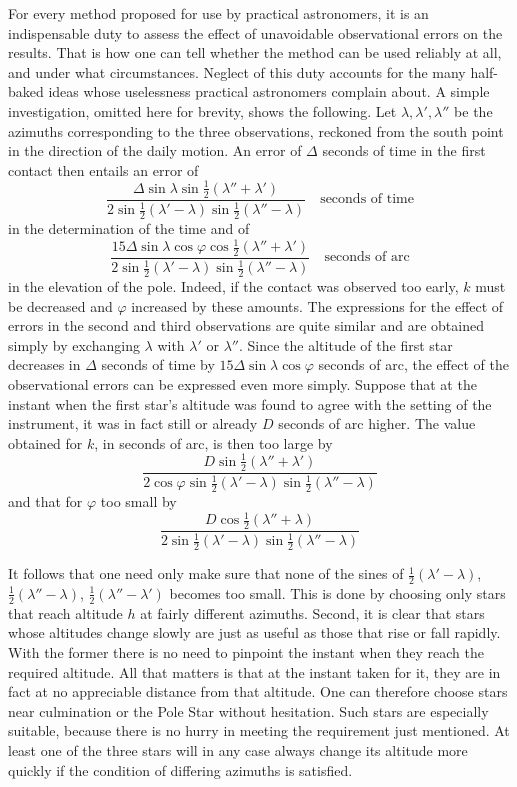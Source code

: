 For every method proposed for use by practical astronomers, it is an indispensable duty to assess the effect of unavoidable observational errors on the results. That is how one can tell whether the method can be used reliably at all, and under what circumstances. Neglect of this duty accounts for the many half-baked ideas whose uselessness practical astronomers complain about. A simple investigation, omitted here for brevity,
%
shows the following. Let $\lambda,\lambda',\lambda''$ be the azimuths corresponding to the three observations, reckoned from the south point in the direction of the daily motion. An error of $\Delta$ seconds of time in the first contact then entails an error of
\[
\frac{\Delta\sin\lambda\sin\tfrac12(\lambda''+\lambda')}{2\sin\tfrac12(\lambda'-\lambda)\sin\tfrac12(\lambda''-\lambda)}\quad\text{seconds of time}
\]
in the determination of the time and of
\[
\frac{15\Delta\sin\lambda\cos\varphi\cos\tfrac12(\lambda''+\lambda')}{2\sin\tfrac12(\lambda'-\lambda)\sin\tfrac12(\lambda''-\lambda)}\quad\text{seconds of arc}
\]
in the elevation of the pole. Indeed, if the contact was observed too early, $k$ must be decreased and $\varphi$ increased by these amounts. The expressions for the effect of errors in the second and third observations are quite similar and are obtained simply by exchanging $\lambda$ with $\lambda'$ or $\lambda''$. Since the altitude of the first star decreases in $\Delta$ seconds of time by $15\Delta\sin\lambda\cos\varphi$ seconds of arc, the effect of the observational errors can be expressed even more simply. Suppose that at the instant when the first star’s altitude was found to agree with the setting of the instrument, it was in fact still or already $D$ seconds of arc higher. The value obtained for $k$, in seconds of arc, is then too large by
\[
\frac{D\sin\tfrac12(\lambda''+\lambda')}{2\cos\varphi\sin\tfrac12(\lambda'-\lambda)\sin\tfrac12(\lambda''-\lambda)}
\]
and that for $\varphi$ too small by
\[
\frac{D\cos\tfrac12(\lambda''+\lambda)}{2\sin\tfrac12(\lambda'-\lambda)\sin\tfrac12(\lambda''-\lambda)}
\]

It follows that one need only make sure that none of the sines of $\tfrac12(\lambda'-\lambda)$, $\tfrac12(\lambda''-\lambda)$, $\tfrac12(\lambda''-\lambda')$ becomes too small. This is done by choosing only stars that reach altitude $h$ at fairly different azimuths. Second, it is clear that stars whose altitudes change slowly are just as useful as those that rise or fall rapidly. With the former there is no need to pinpoint the instant when they reach the required altitude. All that matters is that at the instant taken for it, they are in fact at no appreciable distance from that altitude. One can therefore choose stars near culmination or the Pole Star without hesitation. Such stars are especially suitable,
%
because there is no hurry in meeting the requirement just mentioned. At least one of the three stars will in any case always change its altitude more quickly if the condition of differing azimuths is satisfied.

